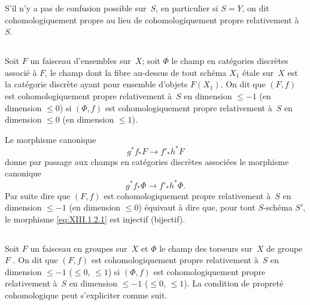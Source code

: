 S'il n'y a pas de confusion possible sur~$S$, en particulier si $S=Y$,
on dit cohomologiquement propre au lieu de cohomologiquement propre
relativement \`a~$S$.

\subsection{}
\label{XIII.1.2}
Soit $F$ un faisceau d'ensembles sur~$X$; soit $\Phi$ le champ en
cat\'egories discr\`etes associ\'e \`a $F$, \ie le champ dont
la fibre au-dessus de tout sch\'ema $X_1$ \'etale sur~$X$ est la
cat\'egorie discr\`ete ayant pour ensemble d'objets $F(X_1)$. On
dit que $(F,f)$ est cohomologiquement propre relativement \`a~$S$ en
dimension $\leqslant -1$ (\resp en dimension $\leqslant 0$) si $(\Phi,
f)$ est cohomologiquement propre relativement \`a~$S$ en dimension
$\leqslant 0$ (\resp en dimension $\leqslant 1$).

Le
morphisme canonique
\begin{equation*}
\label{eq:XIII.1.2.1}
\tag{\thesubsection.1} { g^* f_* F \to f'_* h^* F }
\end{equation*}
donne par passage aux champs en cat\'egories discr\`etes
associ\'ees le morphisme canonique
$$
g^* f_* \Phi \to f'_* h^* \Phi \text{.}
$$
Par suite dire que $(F,f)$ est cohomologiquement propre relativement
\`a~$S$ en dimension $\leqslant -1$ (\resp en dimension $\leqslant
0$) \'equivaut \`a dire que, pour tout $S$-sch\'ema $S'$, le
morphisme \eqref{eq:XIII.1.2.1} est injectif (\resp bijectif).

\subsection{}
\label{XIII.1.3}
Soit $F$ un faisceau en groupes sur~$X$ et $\Phi$ le champ des
torseurs sur~$X$ de groupe $F$ \cite[II 2.3.2]{XIII.1}. On dit que $(F,f)$ est
cohomologiquement propre relativement \`a~$S$ en dimension
$\leqslant -1$ (\resp $\leqslant 0$, \resp $\leqslant 1$) si
$(\Phi,f)$ est cohomologiquement propre relativement \`a~$S$ en
dimension $\leqslant -1$ (\resp $\leqslant 0$, \resp $\leqslant
1$). La condition de propret\'e cohomologique peut s'expliciter
comme suit.

